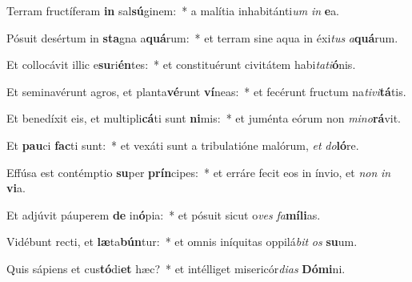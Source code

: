 \item Terram fructíferam \textbf{in} sal\textbf{sú}ginem:~* a malítia inhabitánti\textit{um} \textit{in} \textbf{e}a.
\item Pósuit desértum in \textbf{sta}gna a\textbf{quá}rum:~* et terram sine aqua in éxi\textit{tus} \textit{a}\textbf{quá}rum.
\item Et collocávit illic e\textbf{su}ri\textbf{én}tes:~* et constituérunt civitátem habi\textit{ta}\textit{ti}\textbf{ó}nis.
\item Et seminavérunt agros, et planta\textbf{vé}runt \textbf{ví}neas:~* et fecérunt fructum na\textit{ti}\textit{vi}\textbf{tá}tis.
\item Et benedíxit eis, et multipli\textbf{cá}ti sunt \textbf{ni}mis:~* et juménta eórum non \textit{mi}\textit{no}\textbf{rá}vit.
\item Et \textbf{pau}ci \textbf{fac}ti sunt:~* et vexáti sunt a tribulatióne malórum, \textit{et} \textit{do}\textbf{ló}re.
\item Effúsa est contémptio \textbf{su}per \textbf{prín}cipes:~* et erráre fecit eos in ínvio, et \textit{non} \textit{in} \textbf{vi}a.
\item Et adjúvit páuperem \textbf{de} in\textbf{ó}pia:~* et pósuit sicut o\textit{ves} \textit{fa}\textbf{mí}\textbf{li}as.
\item Vidébunt recti, et \textbf{læ}ta\textbf{bún}tur:~* et omnis iníquitas oppilá\textit{bit} \textit{os} \textbf{su}um.
\item Quis sápiens et cus\textbf{tó}di\textbf{et} hæc?~* et intélliget misericór\textit{di}\textit{as} \textbf{Dó}\textbf{mi}ni.
